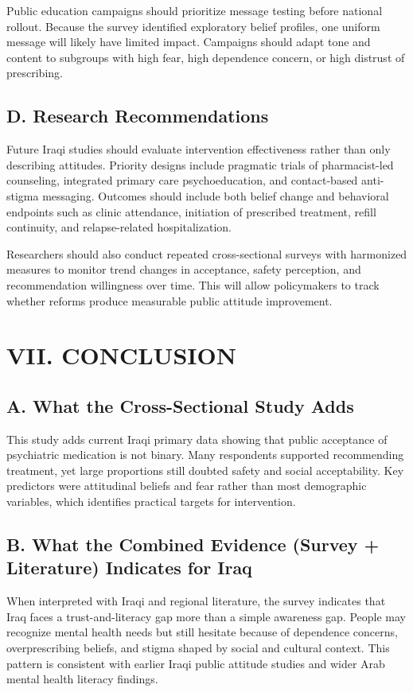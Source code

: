 \documentclass[12pt,a4paper]{article}
\begin{document}
Public education campaigns should prioritize message testing before national rollout. Because the survey identified exploratory belief profiles, one uniform message will likely have limited impact. Campaigns should adapt tone and content to subgroups with high fear, high dependence concern, or high distrust of prescribing.

\subsection*{D. Research Recommendations}
Future Iraqi studies should evaluate intervention effectiveness rather than only describing attitudes. Priority designs include pragmatic trials of pharmacist-led counseling, integrated primary care psychoeducation, and contact-based anti-stigma messaging. Outcomes should include both belief change and behavioral endpoints such as clinic attendance, initiation of prescribed treatment, refill continuity, and relapse-related hospitalization.

Researchers should also conduct repeated cross-sectional surveys with harmonized measures to monitor trend changes in acceptance, safety perception, and recommendation willingness over time. This will allow policymakers to track whether reforms produce measurable public attitude improvement.

\newpage
\section*{VII. CONCLUSION}
\subsection*{A. What the Cross-Sectional Study Adds}
This study adds current Iraqi primary data showing that public acceptance of psychiatric medication is not binary. Many respondents supported recommending treatment, yet large proportions still doubted safety and social acceptability. Key predictors were attitudinal beliefs and fear rather than most demographic variables, which identifies practical targets for intervention.

\subsection*{B. What the Combined Evidence (Survey + Literature) Indicates for Iraq}
When interpreted with Iraqi and regional literature, the survey indicates that Iraq faces a trust-and-literacy gap more than a simple awareness gap. People may recognize mental health needs but still hesitate because of dependence concerns, overprescribing beliefs, and stigma shaped by social and cultural context. This pattern is consistent with earlier Iraqi public attitude studies and wider Arab mental health literacy findings.
\end{document}
